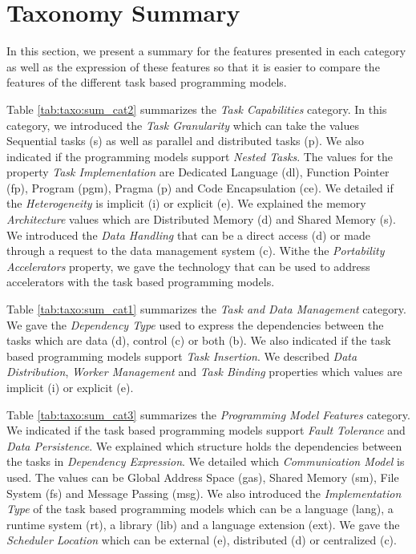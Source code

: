 
\section{Taxonomy Summary}
In this section, we present a summary for the features presented in each category as well as the expression of these features so that it is easier to compare the features of the different task based programming models.

Table \ref{tab:taxo:sum_cat2} summarizes the \textit{Task Capabilities} category.
In this category, we introduced the \textit{Task Granularity} which can take the values Sequential tasks (s) as well as parallel and distributed tasks (p).
We also indicated if the programming models support \textit{Nested Tasks}.
The values for the property \textit{Task Implementation} are Dedicated Language (dl), Function Pointer (fp), Program (pgm), Pragma (p) and Code Encapsulation (ce).
We detailed if the \textit{Heterogeneity} is implicit (i) or explicit (e).
We explained the memory \textit{Architecture} values which are Distributed Memory (d) and Shared Memory (s).
We introduced the \textit{Data Handling} that can be a direct access (d) or made through a request to the data management system (c).
Withe the \textit{Portability Accelerators} property, we gave the technology that can be used to address accelerators with the task based programming models.

Table \ref{tab:taxo:sum_cat1} summarizes the \textit{Task and Data Management} category.
We gave the \textit{Dependency Type} used to express the dependencies between the tasks which are data (d), control (c) or both (b).
We also indicated if the task based programming models support \textit{Task Insertion}.
We described \textit{Data Distribution}, \textit{Worker Management} and \textit{Task Binding} properties which values are implicit (i) or explicit (e).

Table \ref{tab:taxo:sum_cat3} summarizes the \textit{Programming Model Features} category.
We indicated if the task based programming models support \textit{Fault Tolerance} and \textit{Data Persistence}.
We explained which structure holds the dependencies between the tasks in \textit{Dependency Expression}.
We detailed which \textit{Communication Model} is used.
The values can be Global Address Space (gas), Shared Memory (sm), File System (fs) and Message Passing (msg).
We also introduced the \textit{Implementation Type} of the task based programming models which can be a language (lang), a runtime system (rt), a library (lib) and a language extension (ext).
We gave the \textit{Scheduler Location} which can be external (e), distributed (d) or centralized (c).

